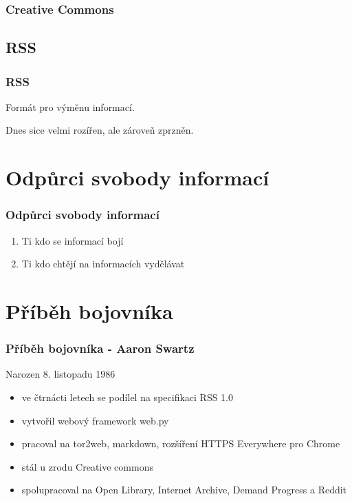 \documentclass[xetex]{beamer}
\begin{document}
\begin{frame}
	\frametitle{Creative Commons}
	
\end{frame}

\subsection{RSS}
\begin{frame}
	\frametitle{RSS}

	Formát pro výměnu informací.

	\medskip

	Dnes sice velmi rozířen, ale zároveň zprzněn.

	\bigskip

\end{frame}

\section{Odpůrci svobody informací}
\begin{frame}
	\frametitle{Odpůrci svobody informací}
	\begin{enumerate}
		\item Ti kdo se informací bojí
		\item Ti kdo chtějí na informacích vydělávat
	\end{enumerate}

\end{frame}

\section{Příběh bojovníka}
\begin{frame}
	\frametitle{Příběh bojovníka - Aaron Swartz}
	Narozen 8. listopadu 1986

	\begin{itemize}
		\item ve čtrnácti letech se podílel na specifikaci RSS 1.0
		\item vytvořil webový framework web.py
		\item pracoval na tor2web, markdown, rozšíření HTTPS Everywhere pro Chrome
		\item stál u zrodu Creative commons
		\item spolupracoval na Open Library, Internet Archive, Demand Progress a Reddit
	\end{itemize}

\end{frame}
\end{document}
